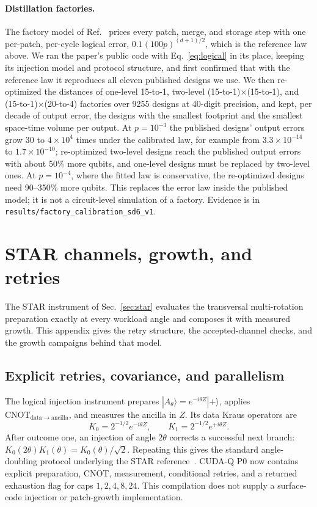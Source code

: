 \documentclass[11pt]{article}
\begin{document}
\paragraph{Distillation factories.} The factory model of
Ref.~\cite{litinski2019magic} prices every patch, merge, and storage step with
one per-patch, per-cycle logical error, $0.1(100p)^{(d+1)/2}$, which is the reference
law above. We ran the paper's public code with Eq.~\eqref{eq:logical} in its place,
keeping its injection model and protocol structure, and first confirmed that with
the reference law it reproduces all eleven published designs we use. We then
re-optimized the distances of one-level 15-to-1, two-level (15-to-1)$\times$(15-to-1),
and (15-to-1)$\times$(20-to-4) factories over 9255 designs at 40-digit precision, and
kept, per decade of output error, the designs with the smallest footprint and the
smallest space-time volume per output. At $p=10^{-3}$ the published designs'
output errors grow 30 to $4\times10^4$ times under the calibrated law, for example
from $3.3\times10^{-14}$ to $1.7\times10^{-10}$; re-optimized two-level designs reach
the published output errors with about 50\% more qubits, and one-level designs
must be replaced by two-level ones. At $p=10^{-4}$, where the fitted law is
conservative, the re-optimized designs need 90--350\% more qubits. This replaces
the error law inside the published model; it is not a circuit-level simulation
of a factory. Evidence is in \texttt{results/factory\_calibration\_sd6\_v1}.


\section{STAR channels, growth, and retries}\label{app:star}
The STAR instrument of Sec.~\ref{sec:star} evaluates the transversal multi-rotation preparation exactly at every workload angle and composes it with measured growth. This appendix gives the retry structure, the accepted-channel checks, and the growth campaigns behind that model.

\subsection{Explicit retries, covariance, and parallelism}\label{sec:rus}
The logical injection instrument prepares
$|A_\theta\rangle=e^{-i\theta Z}|+\rangle$, applies
$\mathrm{CNOT}_{\mathrm{data}\to\mathrm{ancilla}}$, and measures the ancilla
in $Z$. Its data Kraus operators are
\begin{equation}
 K_0=2^{-1/2}e^{-i\theta Z},\qquad
 K_1=2^{-1/2}e^{+i\theta Z}.
\end{equation}
After outcome one, an injection of angle $2\theta$ corrects a successful
next branch: $K_0(2\theta)K_1(\theta)=K_0(\theta)/\sqrt2$.
Repeating this gives the standard angle-doubling protocol underlying the
STAR reference~\cite{akahoshi,toshio}. CUDA-Q P0 now contains explicit
preparation, CNOT, measurement, conditional retries, and a returned exhaustion
flag for caps $1,2,4,8,24$. This compilation does not supply a surface-code
injection or patch-growth implementation.
\end{document}
